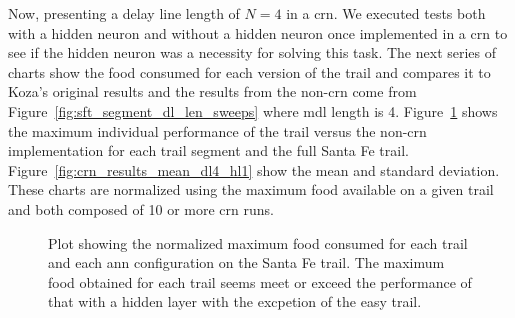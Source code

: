 \clearpage
Now, presenting a delay line length of $N=4$ in a \gls{crn}. We executed tests both with a hidden neuron and without a hidden neuron once implemented in a \gls{crn} to see if the hidden neuron was a necessity for solving this task. The next series of charts show the food consumed for each version of the trail and compares it to Koza's original results and the results from the non-\gls{crn} come from Figure~\ref{fig:sft_segment_dl_len_sweeps} where \gls{mdl} length is 4. Figure~\ref{fig:crn_results_max_dl4_hl1} shows the maximum individual performance of the trail versus the non-\gls{crn} implementation for each trail segment and the full Santa Fe trail. Figure~\ref{fig:crn_results_mean_dl4_hl1} show the mean and standard deviation. These charts are normalized using the maximum food available on a given trail and both composed of 10 or more \gls{crn} runs.

\begin{figure}[hbt]
\centering
{}
\caption[Maximum Normalized Food Results with CRN]{Plot showing the normalized maximum food consumed for each trail and each \gls{ann} configuration on the Santa Fe trail. The maximum food obtained for each trail seems meet or exceed the performance of that with a hidden layer with the excpetion of the easy trail.}
\label{fig:crn_results_max_dl4_hl1}
\end{figure}

